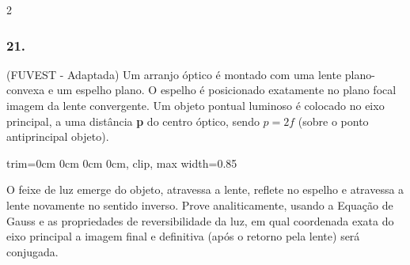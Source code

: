 \documentclass[twoside, 10pt, a4paper]{article}
\newlength{\espacoQuestao}\setlength{\espacoQuestao}{0.2cm}
\newcommand{\larguraTikz}{0.85\linewidth}
\begin{document}
\begin{multicols*}{2}
\subsubsection*{21.} (FUVEST - Adaptada) Um arranjo óptico é montado com uma lente plano-convexa e um espelho plano. O espelho é posicionado exatamente no plano focal imagem da lente convergente. Um objeto pontual luminoso é colocado no eixo principal, a uma distância \textbf{p} do centro óptico, sendo $ p = 2f $ (sobre o ponto antiprincipal objeto).
\begin{center}
\begin{adjustbox}{trim=0cm 0cm 0cm 0cm, clip, max width=\larguraTikz}
\end{adjustbox}
\end{center}
O feixe de luz emerge do objeto, atravessa a lente, reflete no espelho e atravessa a lente novamente no sentido inverso. Prove analiticamente, usando a Equação de Gauss e as propriedades de reversibilidade da luz, em qual coordenada exata do eixo principal a imagem final e definitiva (após o retorno pela lente) será conjugada.
\par\vspace{\espacoQuestao}


\end{multicols*}
\end{document}
